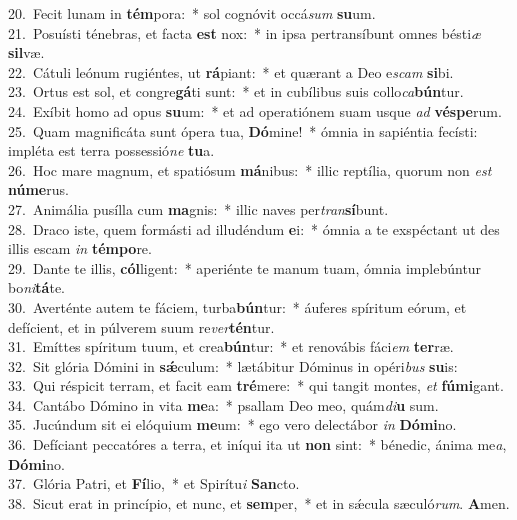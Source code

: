 {20.~}Fecit lunam in \textbf{tém}pora:~* sol cognóvit occá\textit{sum} \textbf{su}um.\\
{21.~}Posuísti ténebras, et facta \textbf{est} nox:~* in ipsa pertransíbunt omnes bésti\textit{æ} \textbf{sil}væ.\\
{22.~}Cátuli leónum rugiéntes, ut \textbf{rá}piant:~* et quærant a Deo e\textit{scam} \textbf{si}bi.\\
{23.~}Ortus est sol, et congre\textbf{gá}ti sunt:~* et in cubílibus suis collo\textit{ca}\textbf{bún}tur.\\
{24.~}Exíbit homo ad opus \textbf{su}um:~* et ad operatiónem suam usque \textit{ad} \textbf{vé}\textbf{spe}rum.\\
{25.~}Quam magnificáta sunt ópera tua, \textbf{Dó}mine!~* ómnia in sapiéntia fecísti: impléta est terra possessió\textit{ne} \textbf{tu}a.\\
{26.~}Hoc mare magnum, et spatiósum \textbf{má}nibus:~* illic reptília, quorum non \textit{est} \textbf{nú}\textbf{me}rus.\\
{27.~}Animália pusílla cum \textbf{ma}gnis:~* illic naves per\textit{tran}\textbf{sí}bunt.\\
{28.~}Draco iste, quem formásti ad illudéndum \textbf{e}i:~* ómnia a te exspéctant ut des illis escam \textit{in} \textbf{tém}\textbf{po}re.\\
{29.~}Dante te illis, \textbf{cól}ligent:~* aperiénte te manum tuam, ómnia implebúntur bo\textit{ni}\textbf{tá}te.\\
{30.~}Averténte autem te fáciem, turba\textbf{bún}tur:~* áuferes spíritum eórum, et defícient, et in púlverem suum re\textit{ver}\textbf{tén}tur.\\
{31.~}Emíttes spíritum tuum, et crea\textbf{bún}tur:~* et renovábis fáci\textit{em} \textbf{ter}ræ.\\
{32.~}Sit glória Dómini in \textbf{sǽ}culum:~* lætábitur Dóminus in opéri\textit{bus} \textbf{su}is:\\
{33.~}Qui réspicit terram, et facit eam \textbf{tré}mere:~* qui tangit montes, \textit{et} \textbf{fú}\textbf{mi}gant.\\
{34.~}Cantábo Dómino in vita \textbf{me}a:~* psallam Deo meo, quám\textit{di}\textbf{u} sum.\\
{35.~}Jucúndum sit ei elóquium \textbf{me}um:~* ego vero delectábor \textit{in} \textbf{Dó}\textbf{mi}no.\\
{36.~}Defíciant peccatóres a terra, et iníqui ita ut \textbf{non} sint:~* bénedic, ánima me\textit{a}, \textbf{Dó}\textbf{mi}no.\\
{37.~}Glória Patri, et \textbf{Fí}lio,~* et Spirítu\textit{i} \textbf{San}cto.\\
{38.~}Sicut erat in princípio, et nunc, et \textbf{sem}per,~* et in sǽcula sæculó\textit{rum}. \textbf{A}men.\\
